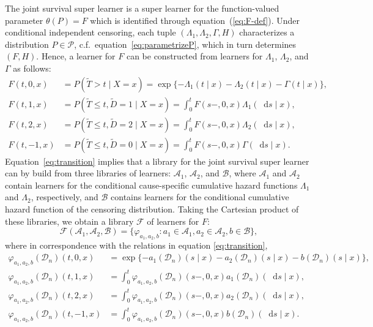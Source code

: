 \documentclass[lineno]{biometrika}
\renewcommand{\phi}{\varphi}
\newcommand*\diff{\mathop{}\!\mathrm{d}}
\newcommand{\1}{\mathds{1}}
\newcommand{\data}{\ensuremath{\mathcal{D}}}
\begin{document}
The joint survival super learner is a super learner for the
function-valued parameter $\theta(P) = F$ which is identified through
equation~(\ref{eq:F-def}). Under conditional independent censoring,
each tuple $(\Lambda_{1}, \Lambda_{2}, \Gamma, H)$ characterizes a
distribution \(P\in\mathcal P\), c.f.\
equation~\eqref{eq:parametrizeP}, which in turn determines
\( (F, H) \). Hence, a learner for \( F \) can be constructed from
learners for \( \Lambda_1 \), \( \Lambda_2 \), and $\Gamma$ as
follows:
\begin{equation}\label{eq:transition}
  \begin{split}
    F(t, 0, x)
    &
      = P(\tilde{T} > t \mid X= x)
      =
      \exp{{\{-\Lambda_{1}(t \mid x)-\Lambda_{2}(t \mid x) - \Gamma(t \mid x)\}
      }},
    \\
    F(t, 1, x)
    &
      = P(\tilde{T} \leq t, \tilde{D}=1 \mid X=x)
      = \int_0^t F(s-, 0, x)  \Lambda_{1}(\diff s \mid x),
    \\
    F(t, 2, x)
    &
      = P(\tilde{T} \leq t, \tilde{D}=2 \mid X=x)
      = \int_0^t  F(s-, 0, x)  \Lambda_{2}(\diff s \mid x),
    \\
    F(t, -1, x)
    &
      = P(\tilde{T} \leq t, \tilde{D}=0 \mid X=x)
      = \int_0^t F(s-, 0, x)  \Gamma(\diff s \mid x).
  \end{split}
\end{equation}
Equation~\eqref{eq:transition} implies that a library for the joint survival super learner can by build from three libraries of learners:
\(\mathcal{A}_1\), \( \mathcal{A}_2 \), and \( \mathcal{B} \),
where \(\mathcal{A}_1\) and \( \mathcal{A}_2\) contain
learners for the conditional cause-specific cumulative hazard
functions \(\Lambda_1\) and \( \Lambda_2\), respectively, and
\(\mathcal{B}\) contains learners for the conditional
cumulative hazard function of the censoring distribution.
Taking the Cartesian product of these libraries, we obtain a library
$\mathcal{F}$ of learners for \( F \):
\begin{equation}
  \label{eq:jssl-lib-def}
  \mathcal{F}(\mathcal{A}_1, \mathcal{A}_2, \mathcal{B})
  = \{ \phi_{a_1,a_2, b} : a_1 \in \mathcal{A}_1, a_2 \in \mathcal{A}_2, b \in \mathcal{B}\},
\end{equation}
where in correspondence with the relations in equation
\eqref{eq:transition},
\begin{equation}
  \begin{split}\label{eq:anti-transition}
    \phi_{a_1,a_2, b}(\data_n)(t,0,x)
  &= \exp{\{-a_1(\data_n)(s \mid x)-a_2(\data_n)(s \mid x) - b(\data_n)(s \mid
    x)\} },
  \\
  \phi_{a_1,a_2, b}(\data_n)(t,1,x)
  &= \int_0^t
    \phi_{a_1,a_2, b}(\data_n)(s-,0,x)  a_1(\data_n)(\diff s \mid x),
  \\
  \phi_{a_1,a_2, b}(\data_n)(t,2,x)
  &= \int_0^t\phi_{a_1,a_2, b}(\data_n)(s-,0,x)  a_2(\data_n)(\diff s \mid x),
  \\
  \phi_{a_1,a_2, b}(\data_n)(t,-1,x)
  &= \int_0^t \phi_{a_1,a_2, b}(\data_n)(s-,0,x)  b(\data_n)(\diff s \mid x).
  \end{split}
\end{equation}
\end{document}
